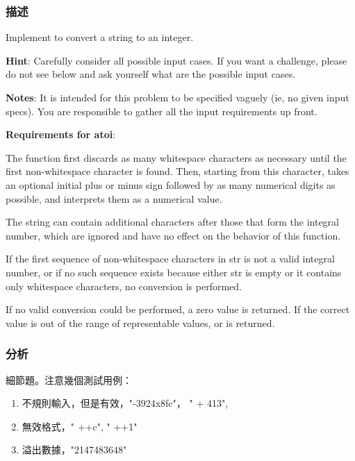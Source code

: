 \subsubsection{描述}
Implement  to convert a string to an integer.

\textbf{Hint}: Carefully consider all possible input cases. If you want a challenge, please do not see below and ask yourself what are the possible input cases.

\textbf{Notes}: It is intended for this problem to be specified vaguely (ie, no given input specs). You are responsible to gather all the input requirements up front.

\textbf{Requirements for atoi}:

The function first discards as many whitespace characters as necessary until the first non-whitespace character is found. Then, starting from this character, takes an optional initial plus or minus sign followed by as many numerical digits as possible, and interprets them as a numerical value.

The string can contain additional characters after those that form the integral number, which are ignored and have no effect on the behavior of this function.

If the first sequence of non-whitespace characters in str is not a valid integral number, or if no such sequence exists because either str is empty or it contains only whitespace characters, no conversion is performed.

If no valid conversion could be performed, a zero value is returned. If the correct value is out of the range of representable values,  or  is returned.

\subsubsection{分析}
細節題。注意幾個測試用例：
\begin{enumerate}
\item 不規則輸入，但是有效，"-3924x8fc"， "  +  413",
\item 無效格式，" ++c", " ++1"
\item 溢出數據，"2147483648"
\end{enumerate}


